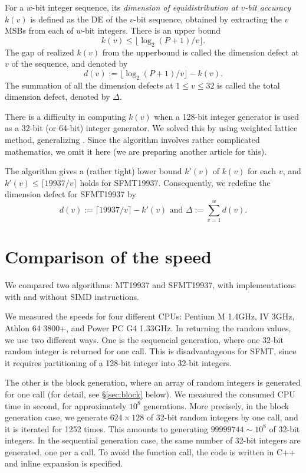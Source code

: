 \documentclass[acmnow]{acmtrans2m}
\begin{document}
For a $w$-bit integer sequence, its {\em dimension of 
equidistribution at $v$-bit accuracy} $k(v)$
is defined as the DE of the $v$-bit sequence, obtained by extracting
the $v$ MSBs from each of $w$-bit integers.
There is an upper bound 
$$
k(v) \leq \lfloor \log_2 (P+1) / v \rfloor.
$$
The gap of realized $k(v)$ from the upperbound is
called the dimension defect at $v$ of the sequence,
and denoted by
$$
d(v):=\lfloor \log_2 (P+1) / v \rfloor -k(v).
$$
The summation of all the dimension defects at
$1 \leq v \leq 32$ is called the total dimension defect, 
denoted by $\Delta$.

There is a difficulty in computing $k(v)$ when 
a 128-bit integer generator is used as a 32-bit 
(or 64-bit) integer generator.
We solved this by using weighted lattice method,
generalizing \cite{CLT}. Since the algorithm involves
rather complicated mathematics, we omit it here
(we are preparing another article for this). 

The algorithm gives a (rather tight) 
lower bound $k'(v)$ of $k(v)$ for each $v$, 
and $k'(v) \leq \lceil 19937/v \rceil$ holds
for SFMT19937.
Consequently, we redefine the dimension defect for SFMT19937 by
$$
d(v):=\lceil 19937/v \rceil - k'(v) 
\mbox{ and } \Delta:=\sum_{v=1}^w d(v).
$$

\section{Comparison of the speed}\label{sec:comp-speed}
We compared two algorithms: MT19937 and SFMT19937,
with implementations with and without SIMD instructions.

We measured the speeds for four different CPUs:
Pentium M 1.4GHz, IV 3GHz, 
Athlon 64 3800+, and Power PC G4 1.33GHz.  
In returning the random values, we use two different ways.
One is the sequencial generation, where one 32-bit random 
integer is returned for one call. This is disadvantageous for 
SFMT, since it requires partitioning of a 128-bit integer
into 32-bit integers.

The other is the block generation, where an array
of random integers is generated for one call (for 
detail, see \S\ref{sec:block} below). 
We measured the consumed CPU time in second, 
for approximately $10^8$ generations. More precisely,
in the block generation case, we generate $624 \times 128$
of 32-bit random integers by one call, and it is iterated
for 1252 times. This amounts to generating
$99999744\sim 10^8$ of 32-bit integers. 
In the sequential generation case, the same number 
of 32-bit integers are generated, one per a call.
To avoid the function call, the code is written 
in C++ and inline expansion is specified.
\end{document}
